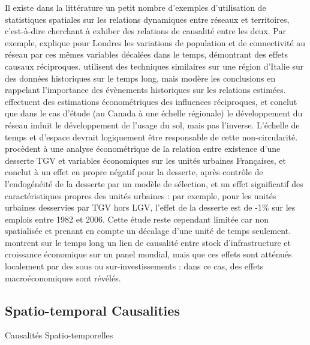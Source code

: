 {}{
Il existe dans la littérature un petit nombre d'exemples d'utilisation de statistiques spatiales sur les relations dynamiques entre réseaux et territoires, c'est-à-dire cherchant à exhiber des relations de causalité entre les deux. Par exemple, \cite{levinson2008density} explique pour Londres les variations de population et de connectivité au réseau par ces mêmes variables décalées dans le temps, démontrant des effets causaux réciproques. \cite{doi:10.1068/b39089} utilisent des techniques similaires sur une région d'Italie sur des données historiques sur le temps long, mais modère les conclusions en rappelant l'importance des évènements historiques sur les relations estimées. \cite{cuthbert2005empirical} effectuent des estimations économétriques des influences réciproques, et conclut que dans le cas d'étude (au Canada à une échelle régionale) le développement du réseau induit le développement de l'usage du sol, mais pas l'inverse. L'échelle de temps et d'espace devrait logiquement être responsable de cette non-circularité. \cite{koning:hal-00962384} procèdent à une analyse économétrique de la relation entre existence d'une desserte TGV et variables économiques sur les unités urbaines Françaises, et conclut à un effet en propre négatif pour la desserte, après contrôle de l'endogénéité de la desserte par un modèle de sélection, et un effet significatif des caractéristiques propres des unités urbaines : par exemple, pour les unités urbaines desservies par TGV hors LGV, l'effet de la desserte est de -1\% sur les emplois entre 1982 et 2006. Cette étude reste cependant limitée car non spatialisée et prenant en compte un décalage d'une unité de temps seulement. \cite{MANC:MANC1073} montrent sur le temps long un lien de causalité entre stock d'infrastructure et croissance économique sur un panel mondial, mais que ces effets sont atténués localement par des sous ou sur-investissements : dans ce cas, des effets macroéconomiques sont révélés.
}





\subsection{Spatio-temporal Causalities}{Causalités Spatio-temporelles}


